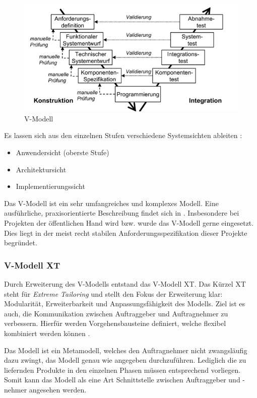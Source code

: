 \begin{figure}
  \centering
  \includegraphics[width=\textwidth]{img/vmodell.png}
  \caption{V-Modell \parencite[][]{Kleuker:2011aa}}
  \label{fig:vmodell}
\end{figure}

Es lassen sich aus den einzelnen Stufen verschiedene Systemsichten ableiten \parencite[vgl.][S. 50]{Schatten:2010aa}: 

\begin{itemize}
\item Anwendersicht (oberste Stufe)
\item Architektursicht 
\item Implementierungssicht
\end{itemize}

Das V-Modell ist ein sehr umfangreiches und komplexes Modell.
Eine ausführliche, praxisorientierte Beschreibung findet sich in \parencite[][]{brohl1993v}.
Insbesondere bei Projekten der öffentlichen Hand wird bzw. wurde das V-Modell gerne eingesetzt.
Dies liegt in der meist recht stabilen Anforderungsspezifikation dieser Projekte begründet.
\parencite[Vgl.][S. 52]{Schatten:2010aa}

\subsubsection{V-Modell XT}

Durch Erweiterung des V-Modells entstand das V-Modell XT.
Das Kürzel XT steht für \emph{Extreme Tailoring} und stellt den Fokus der Erweiterung klar: Modularität, Erweiterbarkeit und Anpassungsfähigkeit des Modells.
Ziel ist es auch, die Kommunikation zwischen Auftraggeber und Auftragnehmer zu verbessern.
Hierfür werden Vorgehensbausteine definiert, welche flexibel kombiniert werden können \parencite[vgl.][S. 222]{Broy:2005aa}.

Das Modell ist ein Metamodell, welches den Auftragnehmer nicht zwangsläufig dazu zwingt, das Modell genau wie angegeben durchzuführen.
Lediglich die zu liefernden Produkte in den einzelnen Phasen müssen entsprechend vorliegen.
Somit kann das Modell als eine Art Schnittstelle zwischen Auftraggeber und -nehmer angesehen werden. \parencite[Vgl.][S. 126]{Kuhrmann:2008aa}

